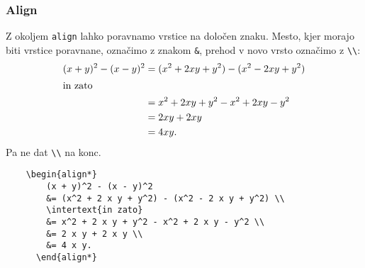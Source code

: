 \documentclass[a4paper, 12pt]{article}
\begin{document}
      \subsubsection{Align}
      Z okoljem \texttt{align} lahko poravnamo vrstice na določen znaku. Mesto, kjer morajo biti
      vrstice poravnane, označimo z znakom \texttt{\&}, prehod v novo vrsto označimo z \verb|\\|:
\begin{align*}
    (x + y)^2 - (x - y)^2
    &= (x^2 + 2 x y + y^2) - (x^2 - 2 x y + y^2) \\
    \intertext{in zato}
    &= x^2 + 2 x y + y^2 - x^2 + 2 x y - y^2 \\
    &= 2 x y + 2 x y \\
    &= 4 x y.
  \end{align*}
  Pa ne dat \verb|\\| na konc.
  \begin{verbatim}
    \begin{align*}
        (x + y)^2 - (x - y)^2
        &= (x^2 + 2 x y + y^2) - (x^2 - 2 x y + y^2) \\
        \intertext{in zato}
        &= x^2 + 2 x y + y^2 - x^2 + 2 x y - y^2 \\
        &= 2 x y + 2 x y \\
        &= 4 x y.
      \end{align*}
  \end{verbatim}
\end{document}
